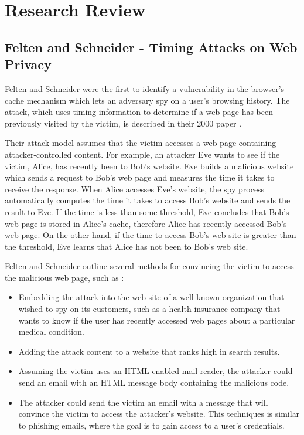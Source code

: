 \documentclass[10pt,a4paper,twoside]{book}
\begin{document}

\chapter{Research Review}
\label{chap:realtedWork}

\section{Felten and Schneider - Timing Attacks on Web Privacy}
\label{feltenschneider}
Felten and Schneider were the first to identify a vulnerability in the browser's cache mechanism which lets an adversary spy on a user's browsing history. The attack, which uses timing information to determine if a web page has been previously visited by the victim, is described in their 2000 paper \cite{felten2000timing}.

Their attack model assumes that the victim accesses a web page containing attacker-controlled content. For example, an attacker Eve wants to see if the victim, Alice, has recently been to Bob's website. Eve builds a malicious website which sends a request to Bob's web page and measures the time it takes to receive the response. When Alice accesses Eve's website, the spy process automatically computes the time it takes to access Bob's website and sends the result to Eve. If the time is less than some threshold, Eve concludes that Bob's web page is stored in Alice's cache, therefore Alice has recently accessed Bob's web page. On the other hand, if the time to access Bob's web site is greater than the threshold, Eve learns that Alice has not been to Bob's web site.

Felten and Schneider outline several methods for convincing the victim to access the malicious web page, such as \cite{felten2000timing}:
\begin{itemize}
\item Embedding the attack into the web site of a well known organization that wished to spy on its customers, such as a health insurance company that wants to know if the user has recently accessed web pages about a particular medical condition.
\item Adding the attack content to a website that ranks high in search results. 
\item Assuming the victim uses an HTML-enabled mail reader, the attacker could send an email with an HTML message body containing the malicious code.
\item The attacker could send the victim an email with a message that will convince the victim to access the attacker's website. This techniques is similar to phishing emails, where the goal is to gain access to a user's credentials.
\end{itemize}
\end{document}
